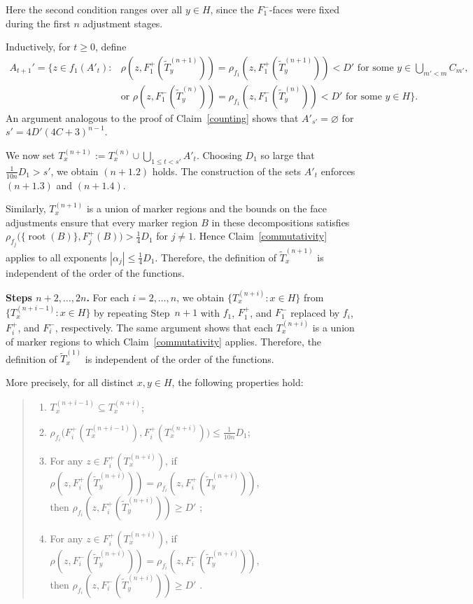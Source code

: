 \documentclass[11pt, reqno, a4paper]{amsart}
\theoremstyle{definition}
\theoremstyle{plain}
\begin{document}
Here the second condition ranges over all $y\in H$, since the
$F_1^-$-faces were fixed during the first $n$ adjustment stages.

Inductively, for $t\ge 0$, define 
 $$
 \begin{aligned}
     A_{t+1}'=\Big\{z\in f_1(A'_t)\colon &\rho(z, F_1^+(\widetilde T_y^{(n+1)}))=
\rho_{f_1}(z, F_1^+(\widetilde T_y^{(n+1)}))< D' \text{ for some } y \in \bigcup_{m'<m}C_{m'},\\& \mbox{or } \rho(z, F_1^-(\widetilde T_y^{(n)}))=
\rho_{f_1}(z, F_1^-(\widetilde T_y^{(n)}))< D'\text{ for some } y \in H\Big\}.
 \end{aligned}
$$
An argument analogous to the proof of
Claim~\ref{counting} shows that $A'_{s'}=\varnothing$ for $s'=4D'(4C+3)^{n-1}$.

We now set $T_x^{(n+1)}:=T_x^{(n)}\cup \bigcup_{1\le t<s'}A'_t$. Choosing $D_1$ so large that
$\frac{1}{10n}D_1>s'$, we obtain $(n+1.2)$ holds. The construction of the sets $A'_t$
enforces $(n+1.3)$ and $(n+1.4)$. 

Similarly, $T_x^{(n+1)}$ is a union of marker regions and the bounds on the face
adjustments ensure that every marker region $B$ in these
decompositions satisfies
$\rho_{f_j}
\bigl(
\{\operatorname{root}(B)\},
F_j^+(B)
\bigr)
>
\frac14D_1$
for $j\ne 1$.
Hence Claim~\ref{commutativity} applies to all exponents
$|\alpha_j|\le \frac14D_1$. Therefore, the definition of
$\widetilde T_x^{(n+1)}$
is independent of the order of the functions.

\medskip
\noindent\textbf{Steps $n+2,\dots,2n$.}
For each $i=2,\ldots,n$, we obtain
$\{T_x^{(n+i)}:x\in H\}$ from
$\{T_x^{(n+i-1)}:x\in H\}$ by repeating Step~$n+1$ with
$f_1$, $F_1^+$, and $F_1^-$ replaced by
$f_i$, $F_i^+$, and $F_i^-$, respectively.
The same argument shows that each $T_x^{(n+i)}$ is a union of marker
regions to which Claim~\ref{commutativity} applies. Therefore, the definition of
$\widetilde T_x^{(1)}$
is independent of the order of the functions.

More precisely, for all distinct $x,y\in H$, the following
properties hold:
\begin{quote}
\begin{enumerate}[label=($n+i$.\arabic*),leftmargin=3.2em]
\item $T_x^{(n+i-1)}\subseteq T_x^{(n+i)}$;
\item $\rho_{f_i}\bigl(F_i^+(T_x^{(n+i-1)}),F_i^+(T_x^{(n+i)})\bigr)\le \frac{1}{10n}D_1$;
\item  For any $z\in F_i^+(T_x^{(n+i)})$, if $\rho(z, F_i^+(\widetilde T_y^{(n+i)}))=
\rho_{f_i}(z, F_i^+(\widetilde T_y^{(n+i)}))$, \\then $\rho_{f_i}(z, F_i^+(\widetilde T_y^{(n+i)}))\ge D'$ ;
\item  For any $z\in F_i^+(T_x^{(n+i)})$, if $\rho(z, F_i^-(\widetilde T_y^{(n+i)}))=
\rho_{f_i}(z, F_i^-(\widetilde T_y^{(n+i)}))$, \\then $\rho_{f_i}(z, F_i^-(\widetilde T_y^{(n+i)}))\ge D'$ .
\end{enumerate}
\end{quote}
\medskip
\end{document}
